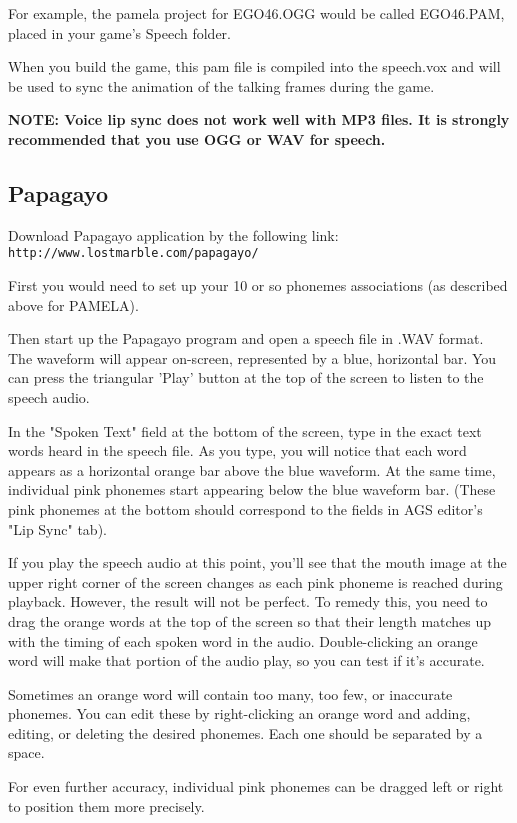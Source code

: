 For example, the pamela project for  EGO46.OGG  would be called  EGO46.PAM, placed
in your game's Speech folder.

When you build the game, this pam file is compiled into the speech.vox and will be used
to sync the animation of the talking frames during the game.

\bf{NOTE:} Voice lip sync does not work well with MP3 files. It is strongly recommended
that you use OGG or WAV for speech.


\subsection{Papagayo}

Download Papagayo application by the following link:
\verb$http://www.lostmarble.com/papagayo/$

First you would need to set up your 10 or so phonemes associations (as described above for PAMELA).

Then start up the Papagayo program and open a speech file in .WAV format. The waveform will appear
on-screen, represented by a blue, horizontal bar. You can press the triangular 'Play' button
at the top of the screen to listen to the speech audio.

In the "Spoken Text" field at the bottom of the screen, type in the exact text words heard in the
speech file. As you type, you will notice that each word appears as a horizontal orange bar above
the blue waveform. At the same time, individual pink phonemes start appearing below
the blue waveform bar. (These pink phonemes at the bottom should correspond to the fields
in AGS editor's "Lip Sync" tab).

If you play the speech audio at this point, you'll see that the mouth image at the upper right
corner of the screen changes as each pink phoneme is reached during playback. However, the result
will not be perfect. To remedy this, you need to drag the orange words at the top of the screen
so that their length matches up with the timing of each spoken word in the audio.
Double-clicking an orange word will make that portion of the audio play, so you can test if it's accurate.

Sometimes an orange word will contain too many, too few, or inaccurate phonemes. You can edit these
by right-clicking an orange word and adding, editing, or deleting the desired phonemes.
Each one should be separated by a space.

For even further accuracy, individual pink phonemes can be dragged left or right to position them
more precisely.

